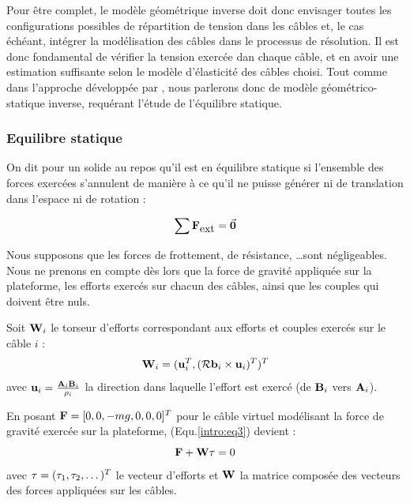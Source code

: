 Pour être complet, le modèle géométrique inverse doit donc envisager toutes les configurations possibles de répartition de tension dans les câbles et, le cas échéant, intégrer la modélisation des câbles dans le processus de résolution. Il est donc fondamental de vérifier la tension exercée dan chaque câble, et en avoir une estimation suffisante selon le modèle d'élasticité des câbles choisi. Tout comme dans l'approche développée par \cite{2010:Carricato.Merlet}, nous parlerons donc de modèle géométrico-statique inverse, requérant l'étude de l'équilibre statique.

\subsubsection{Equilibre statique}

On dit pour un solide au repos qu'il est en équilibre statique si l'ensemble des forces exercées s'annulent de manière à ce qu'il ne puisse générer ni de translation dans l'espace ni de rotation :

\begin{equation}
\sum \mathcal {\bf F}_{\hbox{ext}} = \vec {\bf 0}
\label{intro:eq2}
\end{equation}

Nous supposons que les forces de frottement, de résistance, \dots sont négligeables. Nous ne prenons en compte dès lors que la force de gravité appliquée sur la plateforme, les efforts exercés sur chacun des câbles, ainsi que les couples qui doivent être nuls.

Soit ${\bf W}_i$ le torseur d'efforts correspondant aux efforts et couples exercés sur le câble $i$ :
\begin{equation}
{\bf W}_i = ({\bf u}_i^T, (\mathcal R {\bf b}_i \times {\bf u}_i)^T)^T
\label{intro:eq3}
\end{equation}
avec ${\bf u}_i = \frac{{\bf A}_i{\bf B}_i}{\rho_i}$ la direction dans laquelle l'effort est exercé (de ${\bf B}_i$ vers ${\bf A}_i$).

En posant $\mathcal {\bf F} = [0, 0, -mg, 0, 0, 0]^T$ pour le câble virtuel modélisant la force de gravité exercée sur la plateforme, (Equ.\ref{intro:eq3}) devient :
\begin{equation}
\mathcal {\bf F} + {\bf W} {\bf \tau} = 0
\label{intro:eq4}
\end{equation}
avec ${\bf \tau} = (\tau_1, \tau_2, \dots)^T$ le vecteur d'efforts et ${\bf W}$ la matrice composée des vecteurs des forces appliquées sur les câbles.

